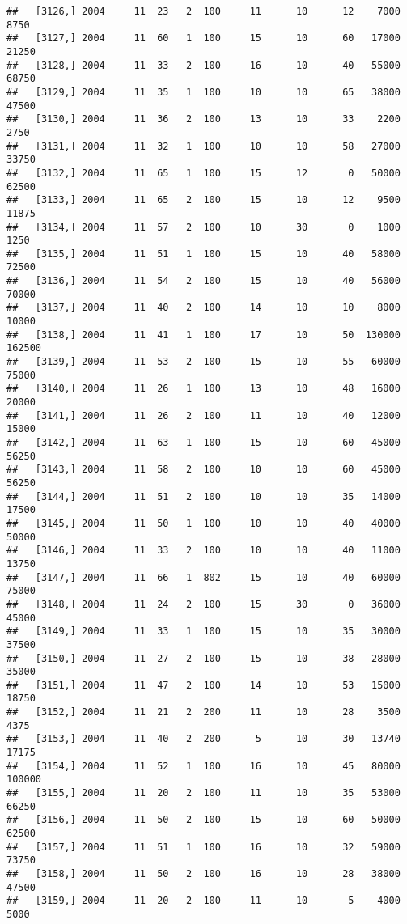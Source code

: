 \documentclass{article}\usepackage[]{graphicx}\usepackage[]{color}
\makeatletter
\newenvironment{kframe}{%
 \def\at@end@of@kframe{}%
 \ifinner\ifhmode%
  \def\at@end@of@kframe{\end{minipage}}%
  \begin{minipage}{\columnwidth}%
 \fi\fi%
 \def\FrameCommand##1{\hskip\@totalleftmargin \hskip-\fboxsep
 \colorbox{shadecolor}{##1}\hskip-\fboxsep
     \hskip-\linewidth \hskip-\@totalleftmargin \hskip\columnwidth}%
 \MakeFramed {\advance\hsize-\width
   \@totalleftmargin\z@ \linewidth\hsize
   \@setminipage}}%
 {\par\unskip\endMakeFramed%
 \at@end@of@kframe}
\newenvironment{knitrout}{}{} %
\makeatother
\begin{document}
\begin{knitrout}
\begin{kframe}
\begin{verbatim}
##   [3126,] 2004     11  23   2  100     11      10      12    7000    8750
##   [3127,] 2004     11  60   1  100     15      10      60   17000   21250
##   [3128,] 2004     11  33   2  100     16      10      40   55000   68750
##   [3129,] 2004     11  35   1  100     10      10      65   38000   47500
##   [3130,] 2004     11  36   2  100     13      10      33    2200    2750
##   [3131,] 2004     11  32   1  100     10      10      58   27000   33750
##   [3132,] 2004     11  65   1  100     15      12       0   50000   62500
##   [3133,] 2004     11  65   2  100     15      10      12    9500   11875
##   [3134,] 2004     11  57   2  100     10      30       0    1000    1250
##   [3135,] 2004     11  51   1  100     15      10      40   58000   72500
##   [3136,] 2004     11  54   2  100     15      10      40   56000   70000
##   [3137,] 2004     11  40   2  100     14      10      10    8000   10000
##   [3138,] 2004     11  41   1  100     17      10      50  130000  162500
##   [3139,] 2004     11  53   2  100     15      10      55   60000   75000
##   [3140,] 2004     11  26   1  100     13      10      48   16000   20000
##   [3141,] 2004     11  26   2  100     11      10      40   12000   15000
##   [3142,] 2004     11  63   1  100     15      10      60   45000   56250
##   [3143,] 2004     11  58   2  100     10      10      60   45000   56250
##   [3144,] 2004     11  51   2  100     10      10      35   14000   17500
##   [3145,] 2004     11  50   1  100     10      10      40   40000   50000
##   [3146,] 2004     11  33   2  100     10      10      40   11000   13750
##   [3147,] 2004     11  66   1  802     15      10      40   60000   75000
##   [3148,] 2004     11  24   2  100     15      30       0   36000   45000
##   [3149,] 2004     11  33   1  100     15      10      35   30000   37500
##   [3150,] 2004     11  27   2  100     15      10      38   28000   35000
##   [3151,] 2004     11  47   2  100     14      10      53   15000   18750
##   [3152,] 2004     11  21   2  200     11      10      28    3500    4375
##   [3153,] 2004     11  40   2  200      5      10      30   13740   17175
##   [3154,] 2004     11  52   1  100     16      10      45   80000  100000
##   [3155,] 2004     11  20   2  100     11      10      35   53000   66250
##   [3156,] 2004     11  50   2  100     15      10      60   50000   62500
##   [3157,] 2004     11  51   1  100     16      10      32   59000   73750
##   [3158,] 2004     11  50   2  100     16      10      28   38000   47500
##   [3159,] 2004     11  20   2  100     11      10       5    4000    5000

\end{verbatim}
\end{kframe}
\end{knitrout}
\end{document}
